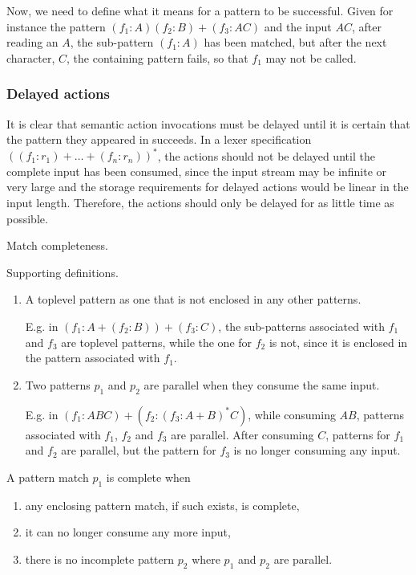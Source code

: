 Now, we need to define what it means for a pattern to be successful. Given for
instance the pattern $(f_1:A)(f_2:B)+(f_3:AC)$ and the input $AC$, after reading
an $A$, the sub-pattern $(f_1:A)$ has been matched, but after the next
character, $C$, the containing pattern fails, so that $f_1$ may not be called.

\subsubsection{Delayed actions}

It is clear that semantic action invocations must be delayed until it is certain
that the pattern they appeared in succeeds. In a lexer specification $((f_1:r_1)
+ \dots + (f_n:r_n))^*$, the actions should not be delayed until the complete
input has been consumed, since the input stream may be infinite or very large
and the storage requirements for delayed actions would be linear in the input
length. Therefore, the actions should only be delayed for as little time as
possible.

\begin{defn}
   Match completeness.

   Supporting definitions.
   \begin{enumerate}

      \item A toplevel pattern as one that is not enclosed in any other patterns.
         
         E.g. in $(f_1:A+(f_2:B))+(f_3:C)$, the sub-patterns associated with
         $f_1$ and $f_3$ are toplevel patterns, while the one for $f_2$ is not,
         since it is enclosed in the pattern associated with $f_1$.

      \item Two patterns $p_1$ and $p_2$ are parallel when they consume the same
         input.

         E.g. in $(f_1:ABC)+(f_2:(f_3:A+B)^*C)$, while consuming $AB$, patterns
         associated with $f_1$, $f_2$ and $f_3$ are parallel. After consuming
         $C$, patterns for $f_1$ and $f_2$ are parallel, but the pattern for
         $f_3$ is no longer consuming any input.

   \end{enumerate}

   A pattern match $p_1$ is complete when
   \begin{enumerate}

      \item any enclosing pattern match, if such exists, is complete,

      \item it can no longer consume any more input,

      \item there is no incomplete pattern $p_2$ where $p_1$ and $p_2$ are
         parallel.

   \end{enumerate}

\end{defn}

